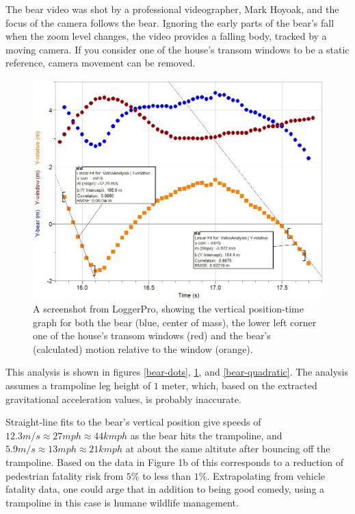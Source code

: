 \documentclass[prb,twocolumn]{revtex4-2}
\begin{document}
The bear video was shot by a professional videographer, Mark Hoyoak, and the focus of the camera follows the bear.  Ignoring the early parts of the bear's fall when the zoom level changes, the video provides a falling body, tracked by a moving camera.  If you consider one of the house's transom windows to be a static reference, camera movement can be removed.

\begin{figure}[h]
\centering
\includegraphics[width=\columnwidth]{bear-speed.jpg}
\caption{
A screenshot from LoggerPro, showing the vertical position-time graph for both the bear (blue, center of mass), the lower left corner one of the house's transom windows (red) and the bear's (calculated)  motion relative to the window (orange). 
}
\label{bear-speed}
\end{figure}

This analysis is shown in figures \ref{bear-dots}, \ref{bear-speed}, and \ref{bear-quadratic}.
 The analysis assumes a trampoline leg height of $1$ meter, which, based on the extracted gravitational acceleration values, is probably inaccurate.
 
 Straight-line fits to the bear's vertical position give speeds of $12.3m/s\approx27mph\approx44kmph$ as the bear hits the trampoline, and $5.9m/s\approx13mph\approx21kmph$ at about the same altitute after bouncing off the trampoline.  Based on the data in Figure 1b of \cite{AccidentRisk} this corresponds to a reduction of pedestrian fatality risk from $5\%$ to less than $1\%$.  Extrapolating from vehicle fatality data, one could arge that in addition to being good comedy, using a trampoline in this case is humane wildlife management.     
     
\end{document}
